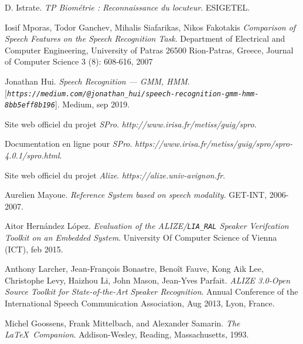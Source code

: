 \documentclass[a4paper, 12pt]{book}
\begin{document}
\begin{thebibliography}{9}
D. Istrate.
\textit{TP Biométrie : Reconnaissance du locuteur}. 
ESIGETEL.

Iosif Mporas, Todor Ganchev, Mihalis Siafarikas, Nikos Fakotakis
\textit{Comparison of Speech Features on the Speech Recognition Task}. 
Department of Electrical and Computer Engineering, University of Patras 26500 Rion-Patras, Greece, Journal of Computer Science 3 (8): 608-616, 2007

Jonathan Hui.
\textit{Speech Recognition — GMM, HMM}.
[\textit{\texttt{https://medium.com/@jonathan\_hui/speech-recognition-gmm-hmm-8bb5eff8b196}}].
Medium, sep 2019.

Site web officiel du projet \textit{SPro}.
\textit{http://www.irisa.fr/metiss/guig/spro}.

Documentation en ligne pour \textit{SPro}.
\textit{https://www.irisa.fr/metiss/guig/spro/spro-4.0.1/spro.html}.

Site web officiel du projet \textit{Alize}.
\textit{https://alize.univ-avignon.fr}.

Aurelien Mayoue. 
\textit{Reference System based on speech modality}. 
GET-INT, 2006-2007.

Aitor Hernández López. 
\textit{Evaluation of the ALIZE/\texttt{LIA\_RAL} Speaker Verifcation Toolkit on an Embedded System}. 
University Of Computer Science of Vienna (ICT), feb 2015.

Anthony Larcher, Jean-François Bonastre, Benoît Fauve, Kong Aik Lee, Christophe Levy, Haizhou Li, John Mason, Jean-Yves Parfait.
\textit{ALIZE 3.0-Open Source Toolkit for State-of-the-Art Speaker Recognition}. 
Annual Conference of the International Speech Communication Association, Aug 2013, Lyon, France.

Michel Goossens, Frank Mittelbach, and Alexander Samarin. 
\textit{The \LaTeX\ Companion}. 
Addison-Wesley, Reading, Massachusetts, 1993.

\end{thebibliography}

%
%
\end{document}
